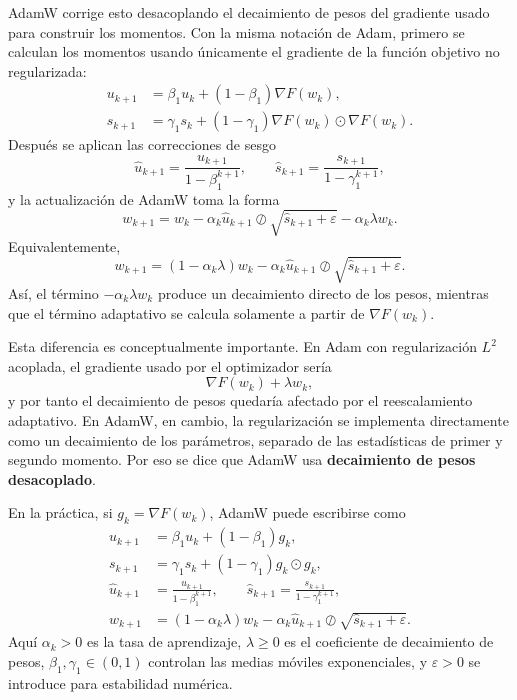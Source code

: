 \documentclass[11pt]{report}
\theoremstyle{definition}
\theoremstyle{plain}
\numberwithin{equation}{section}
\begin{document}
AdamW corrige esto desacoplando el decaimiento de pesos del gradiente usado para construir los momentos. Con la misma notación de Adam, primero se calculan los momentos usando únicamente el gradiente de la función objetivo no regularizada:
\begin{align*}
    u_{k+1}
    &=
    \beta_1u_k+(1-\beta_1)\nabla F(w_k),
    \\
    s_{k+1}
    &=
    \gamma_1s_k+(1-\gamma_1)\nabla F(w_k)\odot\nabla F(w_k).
\end{align*}
Después se aplican las correcciones de sesgo
\begin{equation*}
    \widehat{u}_{k+1}
    =
    \frac{u_{k+1}}{1-\beta_1^{k+1}},
    \qquad
    \widehat{s}_{k+1}
    =
    \frac{s_{k+1}}{1-\gamma_1^{k+1}},
\end{equation*}
y la actualización de AdamW toma la forma
\begin{equation*}
    w_{k+1}
    =
    w_k
    -
    \alpha_k
    \widehat{u}_{k+1}
    \oslash
    \sqrt{\widehat{s}_{k+1}+\varepsilon}
    -
    \alpha_k\lambda w_k.
    \tag{5.3.5}
\end{equation*}
Equivalentemente,
\begin{equation*}
    w_{k+1}
    =
    (1-\alpha_k\lambda)w_k
    -
    \alpha_k
    \widehat{u}_{k+1}
    \oslash
    \sqrt{\widehat{s}_{k+1}+\varepsilon}.
\end{equation*}
Así, el término \(-\alpha_k\lambda w_k\) produce un decaimiento directo de los pesos, mientras que el término adaptativo se calcula solamente a partir de \(\nabla F(w_k)\).

Esta diferencia es conceptualmente importante. En Adam con regularización \(L^2\) acoplada, el gradiente usado por el optimizador sería
\begin{equation*}
    \nabla F(w_k)+\lambda w_k,
\end{equation*}
y por tanto el decaimiento de pesos quedaría afectado por el reescalamiento adaptativo. En AdamW, en cambio, la regularización se implementa directamente como un decaimiento de los parámetros, separado de las estadísticas de primer y segundo momento. Por eso se dice que AdamW usa \textbf{decaimiento de pesos desacoplado}.

En la práctica, si \(g_k=\nabla F(w_k)\), AdamW puede escribirse como
\begin{align*}
    u_{k+1}
    &=
    \beta_1u_k+(1-\beta_1)g_k,
    \\
    s_{k+1}
    &=
    \gamma_1s_k+(1-\gamma_1)g_k\odot g_k,
    \\
    \widehat{u}_{k+1}
    &=
    \frac{u_{k+1}}{1-\beta_1^{k+1}},
    \qquad
    \widehat{s}_{k+1}
    =
    \frac{s_{k+1}}{1-\gamma_1^{k+1}},
    \\
    w_{k+1}
    &=
    (1-\alpha_k\lambda)w_k
    -
    \alpha_k
    \widehat{u}_{k+1}
    \oslash
    \sqrt{\widehat{s}_{k+1}+\varepsilon}.
    \tag{5.3.6}
\end{align*}
Aquí \(\alpha_k>0\) es la tasa de aprendizaje, \(\lambda\geq0\) es el coeficiente de decaimiento de pesos, \(\beta_1,\gamma_1\in(0,1)\) controlan las medias móviles exponenciales, y \(\varepsilon>0\) se introduce para estabilidad numérica.
\end{document}
